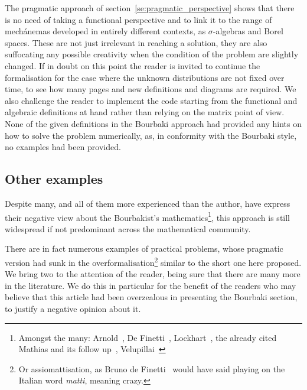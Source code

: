 \documentclass[]{scrartcl}
\theoremstyle{definition}
\begin{document}
The pragmatic approach of section~\ref{se:pragmatic_perspective} shows that there is no need of taking a functional perspective and to link it to the range of mechánemas developed in entirely different contexts, as $\sigma$-algebras and Borel spaces. These are not just irrelevant in reaching a solution, they are also suffocating any possible creativity when the condition of the problem are slightly changed. If in doubt on this point the reader is invited to continue the formalisation for the case where the unknown distributions are not fixed over time, to see how many pages and new definitions and diagrams are required. We also challenge the reader to implement the code starting from the functional and algebraic definitions at hand rather than relying on the matrix point of view. None of the given definitions in the Bourbaki approach had provided any hints on how to solve the problem numerically, as, in conformity with the Bourbaki style, no examples had been provided. 

\subsection*{Other examples}

Despite many, and all of them more experienced than the author, have express their negative view about the Bourbakist's mathematics\footnote{
    Amongst the many: Arnold~\cite{arnol1998teaching}, De Finetti~\cite{de2008bruno}, Lockhart~\cite{lockhart2009mathematician}, the already cited Mathias and its follow up~\cite{mathias1998further}, Velupillai~\cite{velupillai2012bourbaki}
}, this approach is still widespread if not predominant across the mathematical community.

There are in fact numerous examples of practical problems, whose pragmatic version had sunk in the overformalisation\footnote{
    Or assiomattisation, as Bruno de Finetti~\cite{de2008bruno} would have said playing on the Italian word \emph{matti}, meaning crazy.
} similar to the short one here proposed. We bring two to the attention of the reader, being sure that there are many more in the literature. We do this in particular for the benefit of the readers who may believe that this article had been overzealous in presenting the Bourbaki section, to justify a negative opinion about it.
\end{document}
